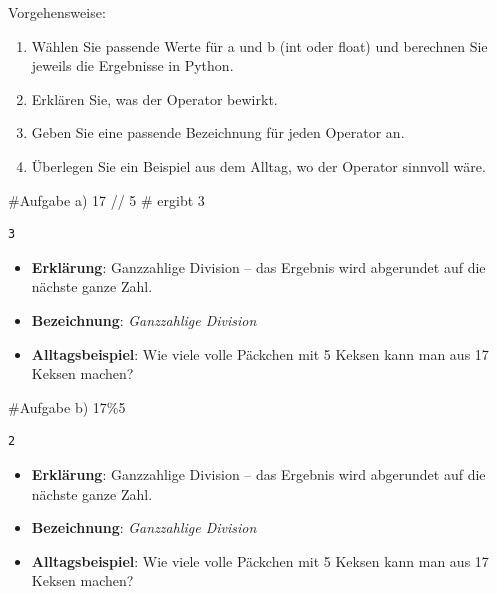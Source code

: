 \documentclass[
  11pt,
  a4paper,
  DIV=11,
  numbers=noendperiod]{scrartcl}
\newenvironment{Shaded}{\begin{snugshade}}{\end{snugshade}}
\newcommand{\CommentTok}[1]{\textcolor[rgb]{0.37,0.37,0.37}{#1}}
\newcommand{\DecValTok}[1]{\textcolor[rgb]{0.68,0.00,0.00}{#1}}
\newcommand{\OperatorTok}[1]{\textcolor[rgb]{0.37,0.37,0.37}{#1}}
\providecommand{\tightlist}{%
  \setlength{\itemsep}{0pt}\setlength{\parskip}{0pt}}\usepackage{longtable,booktabs,array}
\begin{document}
Vorgehensweise:

\begin{enumerate}
\def\labelenumi{\arabic{enumi}.}
\tightlist
\item
  Wählen Sie passende Werte für a und b (int oder float) und berechnen
  Sie jeweils die Ergebnisse in Python.
\item
  Erklären Sie, was der Operator bewirkt.
\item
  Geben Sie eine passende Bezeichnung für jeden Operator an.
\item
  Überlegen Sie ein Beispiel aus dem Alltag, wo der Operator sinnvoll
  wäre.
\end{enumerate}

\begin{Shaded}
\begin{Highlighting}[numbers=left,,]
\CommentTok{\#Aufgabe a)}
\DecValTok{17} \OperatorTok{//} \DecValTok{5}   \CommentTok{\# ergibt 3}
\end{Highlighting}
\end{Shaded}

\begin{verbatim}
3
\end{verbatim}

\begin{itemize}
\tightlist
\item
  \textbf{Erklärung}: Ganzzahlige Division -- das Ergebnis wird
  abgerundet auf die nächste ganze Zahl.
\item
  \textbf{Bezeichnung}: \emph{Ganzzahlige Division}
\item
  \textbf{Alltagsbeispiel}: Wie viele volle Päckchen mit 5 Keksen kann
  man aus 17 Keksen machen?
\end{itemize}

\begin{Shaded}
\begin{Highlighting}[numbers=left,,]
\CommentTok{\#Aufgabe b)}
\DecValTok{17}\OperatorTok{\%}\DecValTok{5}
\end{Highlighting}
\end{Shaded}

\begin{verbatim}
2
\end{verbatim}

\begin{itemize}
\tightlist
\item
  \textbf{Erklärung}: Ganzzahlige Division -- das Ergebnis wird
  abgerundet auf die nächste ganze Zahl.
\item
  \textbf{Bezeichnung}: \emph{Ganzzahlige Division}
\item
  \textbf{Alltagsbeispiel}: Wie viele volle Päckchen mit 5 Keksen kann
  man aus 17 Keksen machen?
\end{itemize}
\end{document}

